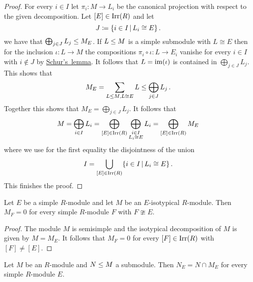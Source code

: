 \begin{proof}
  For every $i \in I$ let $\pi_i \colon M \to L_i$ be the canonical projection with respect to the given decomposition.
  Let $[E] \in \operatorname{Irr}(R)$ and let
  \[
              J
    \defined  \{
                i \in I
              \suchthat
                L_i \cong E
              \} \,.
  \]
  we have that $\bigoplus_{j \in J} L_j \leq M_E$.
  If $L \leq M$ is a simple submodule with $L \cong E$ then for the inclusion $\iota \colon L \to M$ the compositions $\pi_i \circ \iota \colon L \to E_i$ vanishe for every $i \in I$ with $i \notin J$ by \hyperref[proposition: Schurs lemma for modules]{Schur’s~lemma}.
  It follows that $L = \operatorname{im}(\iota)$ is contained in $\bigoplus_{j \in J} L_j$.
  This shows that
  \[
              M_E
    =         \sum_{L \leq M, L \cong E} L
    \leq \bigoplus_{j \in J} L_j \,.
  \]
  Together this shows that $M_E = \bigoplus_{j \in J} L_j$.
  It follows that
  \[
      M
    = \bigoplus_{i \in I} L_i
    = \bigoplus_{[E] \in \operatorname{Irr}(R)} \bigoplus_{\substack{i \in I \\ L_i \cong E}} L_i
    = \bigoplus_{[E] \in \operatorname{Irr}(R)} M_E
  \]
  where we use for the first equality the disjointness of the union
  \[
                                I
    = \bigcup_{[E] \in \Irr(R)} \{ i \in I \suchthat L_i \cong E \} \,.
  \]
  This finishes the proof.
\end{proof}


\begin{corollary}
  Let $E$ be a simple $R$-module and let $M$ be an $E$-isotypical $R$-module.
  Then $M_F = 0$ for every simple $R$-module $F$ with $F \ncong E$.
\end{corollary}


\begin{proof}
  The module $M$ is semisimple and the isotypical decomposition of $M$ is given by $M = M_E$.
  It follows that $M_F = 0$ for every $[F] \in \operatorname{Irr}(R)$ with $[F] \neq [E]$.
\end{proof}


\begin{lemma}
  Let $M$ be an $R$-module and $N \leq M$ a submodule.
  Then $N_E = N \cap M_E$ for every simple $R$-module $E$.
\end{lemma}


